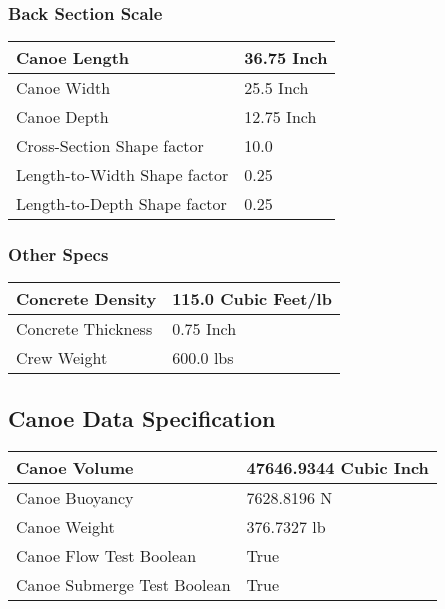 \documentclass{article}%
\begin{document}
%
\subsubsection{Back Section Scale}%
\label{ssubsec:BackSectionScale}%
\renewcommand{\arraystretch}{1.5}%
\begin{tabular}{|l|l|}%
\hline%
Canoe Length&36.75 Inch\\%
\hline%
Canoe Width&25.5 Inch\\%
\hline%
Canoe Depth&12.75 Inch\\%
\hline%
Cross{-}Section Shape factor&10.0\\%
\hline%
Length{-}to{-}Width Shape factor&0.25\\%
\hline%
Length{-}to{-}Depth Shape factor&0.25\\%
\hline%
\end{tabular}

%
\subsubsection{Other Specs}%
\label{ssubsec:OtherSpecs}%
\renewcommand{\arraystretch}{1.5}%
\begin{tabular}{|l|l|}%
\hline%
Concrete Density&115.0 Cubic Feet/lb\\%
\hline%
Concrete Thickness&0.75 Inch\\%
\hline%
Crew Weight&600.0 lbs\\%
\hline%
\end{tabular}

%
\subsection{Canoe Data Specification}%
\label{subsec:CanoeDataSpecification}%
\begin{tabular}{|l|l|}%
\hline%
Canoe Volume&47646.9344 Cubic Inch\\%
\hline%
Canoe Buoyancy&7628.8196 N\\%
\hline%
Canoe Weight&376.7327 lb\\%
\hline%
Canoe Flow Test Boolean&True \\%
\hline%
Canoe Submerge Test Boolean&True \\%
\hline%
\end{tabular}

%
\end{document}

